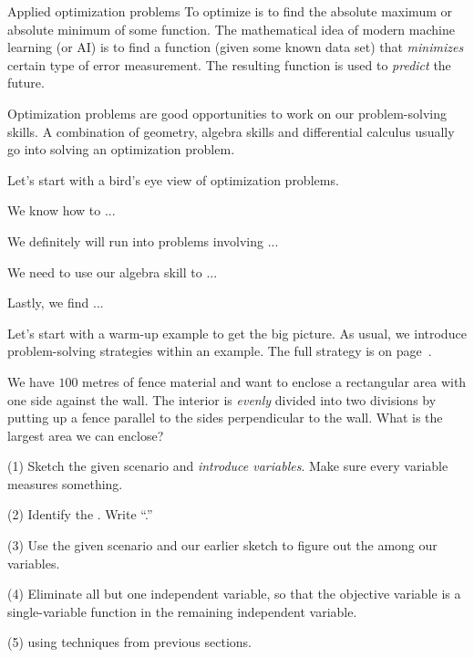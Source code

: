 \documentclass[../main.tex]{subfiles}
\begin{document}
\begin{lesson}{Applied optimization problems}
  To optimize is to find the absolute maximum or absolute minimum of some function. The mathematical idea of modern machine learning (or AI) is to find a function (given some known data set) that \emph{minimizes} certain type of error measurement. The resulting function is used to \emph{predict} the future.

  Optimization problems are good opportunities to work on our problem-solving skills. A combination of geometry, algebra skills and differential calculus usually go into solving an optimization problem.

  \bigskip
  Let's start with a bird's eye view of optimization problems.

  We know how to ...

  We  definitely will run into problems involving ...

  We need to use our algebra skill to ...

  Lastly, we find ...
  \clearpage

  Let's start with a warm-up example to get the big picture. As usual, we introduce problem-solving strategies within an example. The full strategy is on page~\pageref{page:optimization-strategy}.
  \begin{example} \label{ex:optimization-fence}
    We have \(100\) metres of fence material and want to enclose a rectangular area with one side against the wall. The interior is \emph{evenly} divided into two divisions by putting up a fence parallel to the sides perpendicular to the wall. What is the largest area we can enclose?

    (1) Sketch the given scenario and \emph{introduce variables}. Make sure every variable measures something.

    (2) Identify the . Write ``\emph{}.''

    (3) Use the given scenario and our earlier sketch to figure out the  among our variables. 

    (4) Eliminate all but one independent variable, so that the objective variable is a single-variable function in the remaining independent variable.

    (5)  using techniques from previous sections.


\end{example}
\end{lesson}
\end{document}
